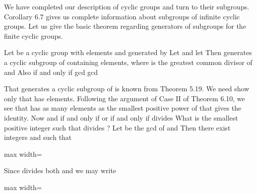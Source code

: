 \documentclass[11pt,oneside]{article}
\begin{document}
\BookNarrativetrue

\begin{BookBody}


\noindent We have completed our description of cyclic groups and turn to their subgroups. Corollary 6.7 gives us complete information about subgroups of infinite cyclic groups. Let us give the basic theorem regarding generators of subgroups for the finite cyclic groups.

 Let  be a cyclic group with  elements and generated by  Let  and let  Then  generates a cyclic subgroup  of  containing  elements, where  is the greatest common divisor of  and  Also if and only if gcd gcd

 That  generates a cyclic subgroup  of  is known from Theorem 5.19. We need show only that  has  elements. Following the argument of Case II of Theorem 6.10, we see that  has as many elements as the smallest positive power  of  that gives the identity. Now  and  if and only if  or if and only if  divides  What is the smallest positive integer  such that  divides ? Let  be the gcd of  and  Then there exist integers  and  such that

\begin{center}\begin{adjustbox}{max width=\linewidth}\end{adjustbox}\end{center}

\noindent Since  divides both  and  we may write

\begin{center}\begin{adjustbox}{max width=\linewidth}\end{adjustbox}\end{center}


\end{BookBody}
\end{document}
